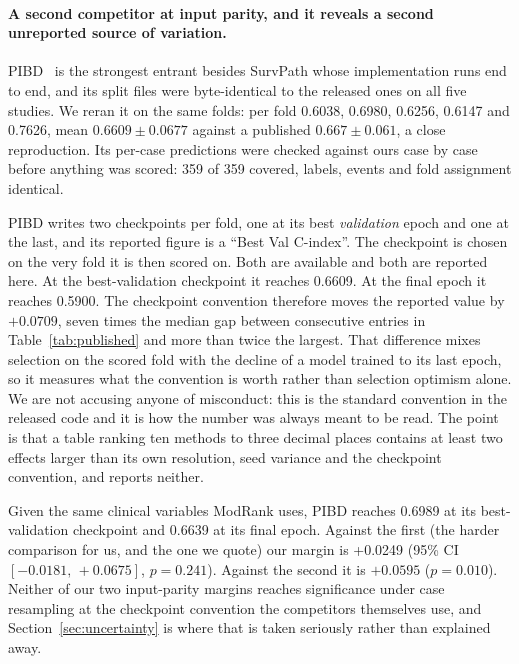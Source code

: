 \documentclass[11pt]{article}
\begin{document}
\paragraph{A second competitor at input parity, and it reveals a second unreported source of
variation.} PIBD~\citep{zhang2024pibd} is the strongest entrant besides SurvPath whose implementation
runs end to end, and its split files were byte-identical to the released ones on all five studies.
We reran it on the same folds: per fold 0.6038, 0.6980, 0.6256, 0.6147 and 0.7626, mean
$\mathbf{0.6609 \pm 0.0677}$ against a published $0.667 \pm 0.061$, a close reproduction. Its
per-case predictions were checked against ours case by case before anything was scored: 359 of 359
covered, labels, events and fold assignment identical.

PIBD writes two checkpoints per fold, one at its best \emph{validation} epoch and one at the last,
and its reported figure is a ``Best Val C-index''. The checkpoint is chosen on the very fold it is
then scored on. Both are available and both are reported here. At the best-validation
checkpoint it reaches 0.6609. At the final epoch it reaches 0.5900. The checkpoint convention
therefore moves the reported value by $+0.0709$, seven times the median gap between consecutive
entries in Table~\ref{tab:published} and more than twice the largest. That difference mixes
selection on the scored fold with the decline of a model trained to its last epoch, so it measures
what the convention is worth rather than selection optimism alone. We are not accusing anyone of misconduct: this is the
standard convention in the released code and it is how the number was always meant to be read. The
point is that a table ranking ten methods to three decimal places contains at least two effects
larger than its own resolution, seed variance and the checkpoint convention, and reports neither.

Given the same clinical variables ModRank uses, PIBD reaches 0.6989 at its best-validation
checkpoint and 0.6639 at its final epoch. Against the first (the harder comparison for us, and the one we quote) our margin is +0.0249 (95\% CI $[-0.0181,\,+0.0675]$, $p=0.241$). Against the second it is $+0.0595$ ($p=0.010$). Neither of our two input-parity margins reaches
significance under case resampling at the checkpoint convention the competitors themselves use,
and Section~\ref{sec:uncertainty} is where that is taken seriously rather than explained away.
\end{document}

